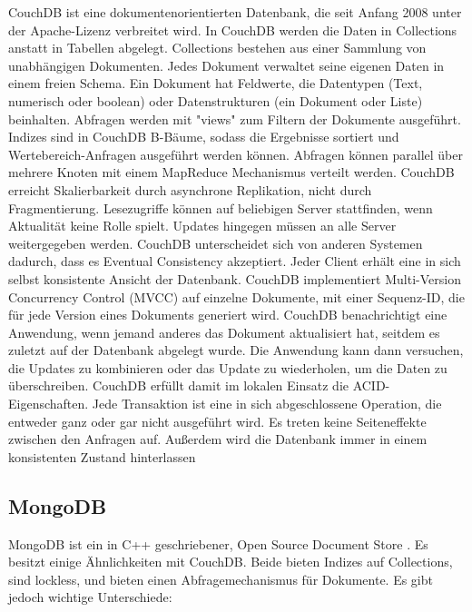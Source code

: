 CouchDB \cite{couch2013} ist eine dokumentenorientierten Datenbank, die seit Anfang 2008 unter der  Apache-Lizenz verbreitet wird. In CouchDB werden die Daten in Collections anstatt in Tabellen abgelegt. Collections bestehen aus einer Sammlung von unabhängigen Dokumenten. Jedes Dokument verwaltet seine eigenen Daten in einem freien Schema. 
Ein Dokument hat Feldwerte, die Datentypen (Text, numerisch oder boolean) oder Datenstrukturen (ein Dokument oder Liste) beinhalten. Abfragen werden mit "views" zum Filtern der Dokumente ausgeführt. Indizes sind in CouchDB B-Bäume, sodass die Ergebnisse sortiert und Wertebereich-Anfragen ausgeführt werden können. Abfragen können parallel über mehrere Knoten mit einem MapReduce Mechanismus verteilt werden. CouchDB erreicht Skalierbarkeit durch asynchrone Replikation, nicht durch Fragmentierung. Lesezugriffe können auf beliebigen Server stattfinden, wenn Aktualität keine Rolle spielt. Updates hingegen müssen an alle Server weitergegeben werden.
CouchDB unterscheidet sich von anderen Systemen dadurch, dass es Eventual Consistency akzeptiert. Jeder Client erhält eine in sich selbst konsistente Ansicht der Datenbank. CouchDB implementiert Multi-Version Concurrency Control (MVCC) auf einzelne Dokumente, mit einer Sequenz-ID, die für jede Version eines Dokuments generiert wird. CouchDB benachrichtigt eine Anwendung, wenn jemand anderes das Dokument aktualisiert hat, seitdem es zuletzt auf der Datenbank abgelegt wurde. Die Anwendung kann dann versuchen, die Updates zu kombinieren oder das Update zu wiederholen, um die Daten zu überschreiben. CouchDB erfüllt damit im lokalen Einsatz die ACID-Eigenschaften. Jede Transaktion ist eine in sich abgeschlossene Operation, die entweder ganz oder gar nicht ausgeführt wird. Es treten keine Seiteneffekte zwischen den Anfragen auf. Außerdem wird die Datenbank immer in einem konsistenten Zustand hinterlassen

\subsection{MongoDB}
\label{ch:AnalyseDatenbanken:sec:Datenbanken:subsec:MongoDB}

MongoDB ist ein in C++ geschriebener, Open Source Document Store \cite{books/daglib/0025185}. Es besitzt einige Ähnlichkeiten mit CouchDB. Beide bieten Indizes auf Collections, sind lockless, und bieten einen Abfragemechanismus für Dokumente. Es gibt jedoch wichtige Unterschiede:

